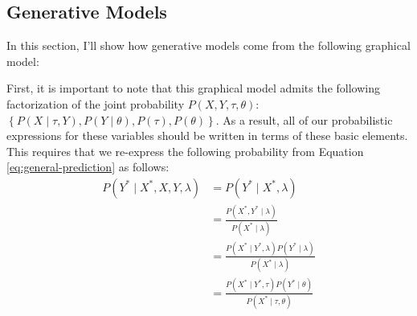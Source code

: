 \documentclass{article}
\begin{document}
\subsection{Generative Models}
In this section, I'll show how generative models come from the following graphical model:
\newline
\begin{center}
\end{center}
First, it is important to note that this graphical model admits the following factorization of the joint probability $P \left( X, Y, \tau, \theta \right)$: $\left\lbrace P\left( X \mid \tau, Y \right), P \left( Y \mid \theta \right), P \left( \tau \right), P \left( \theta \right) \right\rbrace$. As a result, all of our probabilistic expressions for these variables should be written in terms of these basic elements. This requires that we re-express the following probability from Equation \ref{eq:general-prediction} as follows:
\begin{equation}
\label{eq:desired-generative-prediction}
\begin{aligned}
P \left( Y^{*} \mid X^{*}, X, Y, \lambda \right) &= P \left( Y^{*} \mid X^{*}, \lambda \right)\\
&= \frac{P \left( X^{*}, Y^{*} \mid \lambda \right)}{P \left( X^{*} \mid \lambda \right)}\\
&= \frac{P \left( X^{*} \mid Y^{*}, \lambda \right) P \left( Y^{*} \mid \lambda \right)}{ P \left( X^{*} \mid \lambda \right) }\\
&= \frac{P \left( X^{*} \mid Y^{*}, \tau \right) P \left( Y^{*} \mid \theta \right)}{ P \left( X^{*} \mid \tau, \theta \right) }\\
\end{aligned}
\end{equation}
\end{document}
